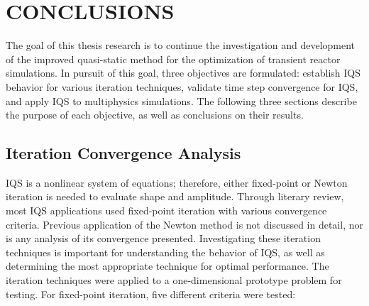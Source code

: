 %
%
%


\chapter{\uppercase{Conclusions}}

The goal of this thesis research is to continue the investigation and development of the improved quasi-static method for the optimization of transient reactor simulations. In pursuit of this goal, three objectives are formulated: establish IQS behavior for various iteration techniques, validate time step convergence for IQS, and apply IQS to multiphysics simulations. The following three sections describe the purpose of each objective, as well as conclusions on their results. 

\section{Iteration Convergence Analysis}

IQS is a nonlinear system of equations; therefore, either fixed-point or Newton iteration is needed to evaluate shape and amplitude. Through literary review, most IQS applications used fixed-point iteration with various convergence criteria. Previous application of the Newton method is not discussed in detail, nor is any analysis of its convergence presented. Investigating these iteration techniques is important for understanding the behavior of IQS, as well as determining the most appropriate technique for optimal performance. The iteration techniques were applied to a one-dimensional prototype problem for testing. For fixed-point iteration, five different criteria were tested: 

